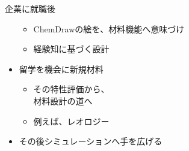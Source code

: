 \documentclass[12pt, dvipdfmx]{beamer}
\begin{document}
\begin{frame}
\begin{columns}[T, onlytextwidth]
\begin{exampleblock}{企業に就職後}
\begin{itemize}
\begin{itemize}
                            \item ChemDrawの絵を、材料機能へ意味づけ
                            \item 経験知に基づく設計
                        \end{itemize}
                        \item 留学を機会に新規材料
                        \begin{itemize}
                            \item その特性評価から、\\材料設計の道へ
                            \item 例えば、レオロジー
                        \end{itemize}
                        \item その後シミュレーションへ手を広げる
                    \end{itemize}
                \end{exampleblock}
        \end{columns}
\end{frame}
\end{document}
